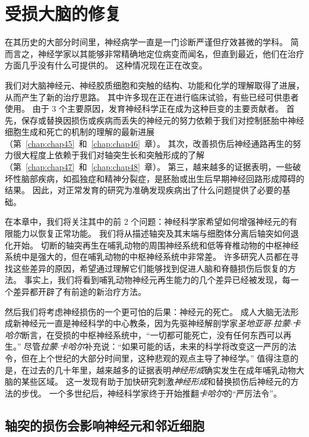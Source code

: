 \chapter{受损大脑的修复} \label{chap:chap50}

在其历史的大部分时间里，神经病学一直是一门诊断严谨但疗效甚微的学科。
简而言之，神经学家以其能够非常精确地定位病变而闻名，但直到最近，他们在治疗方面几乎没有什么可提供的。
这种情况现在正在改变。


我们对大脑神经元、神经胶质细胞和突触的结构、功能和化学的理解取得了进展，从而产生了新的治疗思路。
其中许多现在正在进行临床试验，有些已经可供患者使用。
由于 3 个主要原因，发育神经科学正在成为这种巨变的主要贡献者。
首先，保存或替换因损伤或疾病而丢失的神经元的努力依赖于我们对控制胚胎中神经细胞生成和死亡的机制的理解的最新进展（第~\ref{chap:chap45}~和~\ref{chap:chap46}~章）。
其次，改善损伤后神经通路再生的努力很大程度上依赖于我们对轴突生长和突触形成的了解（第~\ref{chap:chap47}~和~\ref{chap:chap48}~章）。
第三，越来越多的证据表明，一些破坏性脑部疾病，如孤独症和精神分裂症，是胚胎或出生后早期神经回路形成障碍的结果。
因此，对正常发育的研究为准确发现疾病出了什么问题提供了必要的基础。


在本章中，我们将关注其中的前 2 个问题：神经科学家希望如何增强神经元的有限能力以恢复正常功能。
我们将从描述轴突及其末端与细胞体分离后轴突如何退化开始。
切断的轴突再生在哺乳动物的周围神经系统和低等脊椎动物的中枢神经系统中是强大的，但在哺乳动物的中枢神经系统中非常差。
许多研究人员都在寻找这些差异的原因，希望通过理解它们能够找到促进人脑和脊髓损伤后恢复的方法。
事实上，我们将看到哺乳动物神经元再生能力的几个差异已经被发现，每一个差异都开辟了有前途的新治疗方法。


然后我们将考虑神经损伤的一个更可怕的后果：神经元的死亡。
成人大脑无法形成新神经元一直是神经科学的中心教条，因为先驱神经解剖学家\textit{圣地亚哥$\cdot$拉蒙$\cdot$卡哈尔}断言，在受损的中枢神经系统中，“一切都可能死亡，没有任何东西可以再生。” 
尽管\textit{拉蒙$\cdot$卡哈尔}补充说：“如果可能的话，未来的科学将改变这一严厉的法令，但在上个世纪的大部分时间里，这种悲观的观点主导了神经学。”
值得注意的是，在过去的几十年里，越来越多的证据表明\textit{神经形成}确实发生在成年哺乳动物大脑的某些区域。
这一发现有助于加快研究刺激\textit{神经形成}和替换损伤后神经元的方法的步伐。
一个多世纪后，神经科学家终于开始推翻\textit{卡哈尔}的“严厉法令”。



\section{轴突的损伤会影响神经元和邻近细胞}


